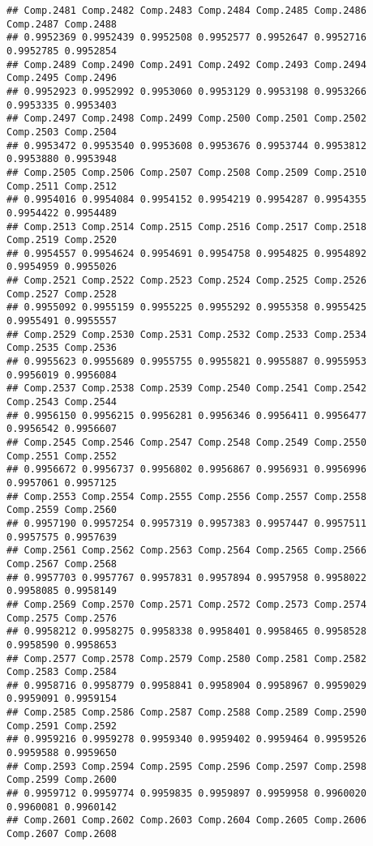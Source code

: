 \documentclass[
]{article}
\begin{document}
\begin{verbatim}
## Comp.2481 Comp.2482 Comp.2483 Comp.2484 Comp.2485 Comp.2486 Comp.2487 Comp.2488 
## 0.9952369 0.9952439 0.9952508 0.9952577 0.9952647 0.9952716 0.9952785 0.9952854 
## Comp.2489 Comp.2490 Comp.2491 Comp.2492 Comp.2493 Comp.2494 Comp.2495 Comp.2496 
## 0.9952923 0.9952992 0.9953060 0.9953129 0.9953198 0.9953266 0.9953335 0.9953403 
## Comp.2497 Comp.2498 Comp.2499 Comp.2500 Comp.2501 Comp.2502 Comp.2503 Comp.2504 
## 0.9953472 0.9953540 0.9953608 0.9953676 0.9953744 0.9953812 0.9953880 0.9953948 
## Comp.2505 Comp.2506 Comp.2507 Comp.2508 Comp.2509 Comp.2510 Comp.2511 Comp.2512 
## 0.9954016 0.9954084 0.9954152 0.9954219 0.9954287 0.9954355 0.9954422 0.9954489 
## Comp.2513 Comp.2514 Comp.2515 Comp.2516 Comp.2517 Comp.2518 Comp.2519 Comp.2520 
## 0.9954557 0.9954624 0.9954691 0.9954758 0.9954825 0.9954892 0.9954959 0.9955026 
## Comp.2521 Comp.2522 Comp.2523 Comp.2524 Comp.2525 Comp.2526 Comp.2527 Comp.2528 
## 0.9955092 0.9955159 0.9955225 0.9955292 0.9955358 0.9955425 0.9955491 0.9955557 
## Comp.2529 Comp.2530 Comp.2531 Comp.2532 Comp.2533 Comp.2534 Comp.2535 Comp.2536 
## 0.9955623 0.9955689 0.9955755 0.9955821 0.9955887 0.9955953 0.9956019 0.9956084 
## Comp.2537 Comp.2538 Comp.2539 Comp.2540 Comp.2541 Comp.2542 Comp.2543 Comp.2544 
## 0.9956150 0.9956215 0.9956281 0.9956346 0.9956411 0.9956477 0.9956542 0.9956607 
## Comp.2545 Comp.2546 Comp.2547 Comp.2548 Comp.2549 Comp.2550 Comp.2551 Comp.2552 
## 0.9956672 0.9956737 0.9956802 0.9956867 0.9956931 0.9956996 0.9957061 0.9957125 
## Comp.2553 Comp.2554 Comp.2555 Comp.2556 Comp.2557 Comp.2558 Comp.2559 Comp.2560 
## 0.9957190 0.9957254 0.9957319 0.9957383 0.9957447 0.9957511 0.9957575 0.9957639 
## Comp.2561 Comp.2562 Comp.2563 Comp.2564 Comp.2565 Comp.2566 Comp.2567 Comp.2568 
## 0.9957703 0.9957767 0.9957831 0.9957894 0.9957958 0.9958022 0.9958085 0.9958149 
## Comp.2569 Comp.2570 Comp.2571 Comp.2572 Comp.2573 Comp.2574 Comp.2575 Comp.2576 
## 0.9958212 0.9958275 0.9958338 0.9958401 0.9958465 0.9958528 0.9958590 0.9958653 
## Comp.2577 Comp.2578 Comp.2579 Comp.2580 Comp.2581 Comp.2582 Comp.2583 Comp.2584 
## 0.9958716 0.9958779 0.9958841 0.9958904 0.9958967 0.9959029 0.9959091 0.9959154 
## Comp.2585 Comp.2586 Comp.2587 Comp.2588 Comp.2589 Comp.2590 Comp.2591 Comp.2592 
## 0.9959216 0.9959278 0.9959340 0.9959402 0.9959464 0.9959526 0.9959588 0.9959650 
## Comp.2593 Comp.2594 Comp.2595 Comp.2596 Comp.2597 Comp.2598 Comp.2599 Comp.2600 
## 0.9959712 0.9959774 0.9959835 0.9959897 0.9959958 0.9960020 0.9960081 0.9960142 
## Comp.2601 Comp.2602 Comp.2603 Comp.2604 Comp.2605 Comp.2606 Comp.2607 Comp.2608 

\end{verbatim}
\end{document}
